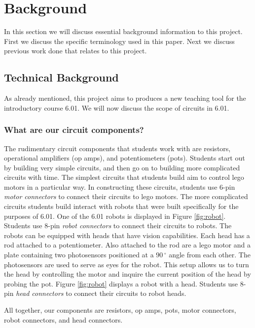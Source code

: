 
\chapter{Background}
\label{ch:background}

In this section we will discuss essential background information to this project.
First we discuss the specific terminology used in this paper. Next we discuss
previous work done that relates to this project.

\section{Technical Background}

As already mentioned, this project aims to produces a new teaching tool for the
introductory course 6.01. We will now discuss the scope of circuits in 6.01.

\subsection{What are our circuit components?}

The rudimentary circuit components that students work with are resistors,
operational amplifiers (op amps), and potentiometers (pots). Students start out
by building very simple circuits, and then go on to building
more complicated circuits with time. The simplest circuits that students build
aim to control lego motors in a particular way. In constructing these circuits,
students use $6$-pin \textit{motor connectors} to connect their circuits to
lego motors.
The more complicated circuits students build interact with robots that were
built specifically for the purposes of 6.01. One of the 6.01 robots is displayed
in Figure \ref{fig:robot}. Students use $8$-pin \textit{robot connectors} to
connect their circuits to robots. The robots can be equipped with heads that have
vision capabilities. Each head has a rod attached to a potentiometer. Also attached
to the rod are a lego motor and a plate containing two photosensors positioned
at a $90\,^{\circ}$ angle from each other. The
photosensors are used to serve as eyes for the robot. This setup allows us to
turn the head by controlling the motor and inquire the current position of the
head by probing the pot. Figure \ref{fig:robot} displays a robot with a head.
Students use $8$-pin \textit{head connectors} to connect their circuits to
robot heads.

All together, our components are resistors, op amps, pots, motor connectors,
robot connectors, and head connectors.


